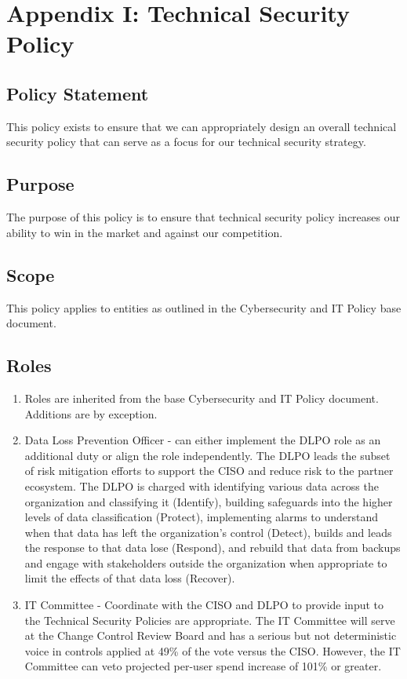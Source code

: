 \documentclass[../main.tex]{subfiles}
\begin{document}
\section{Appendix I: Technical Security Policy}
\subsection{Policy Statement}
This policy exists to ensure that we can appropriately design an overall technical security policy that can serve as a focus for our technical security strategy.
\subsection{Purpose}
The purpose of this policy is to ensure that technical security policy increases our ability to win in the market and against our competition.
\subsection{Scope}
This policy applies to entities as outlined in the Cybersecurity and IT Policy base document.
\subsection{Roles}
\begin{enumerate}
    \item Roles are inherited from the base Cybersecurity and IT Policy document. Additions are by exception.
    \item Data Loss Prevention Officer - \CompanyName can either implement the DLPO role as an additional duty or align the role independently.
    The DLPO leads the subset of risk mitigation efforts to support the CISO and reduce risk to the partner ecosystem. The DLPO is charged with
    identifying various data across the organization and classifying it (Identify), building safeguards into the higher levels of data classification (Protect),
    implementing alarms to understand when that data has left the organization's control (Detect), builds and leads the response to that data lose (Respond),
    and rebuild that data from backups and engage with stakeholders outside the organization when appropriate to limit the effects of that data loss (Recover).
    \item IT Committee - Coordinate with the CISO and DLPO to provide input to the Technical Security Policies are appropriate. The IT Committee will serve at the
    Change Control Review Board and has a serious but not deterministic voice in controls applied at 49\% of the vote versus the CISO. However, the IT Committee can veto
    projected per-user spend increase of 101\% or greater.
\end{enumerate}
\end{document}
